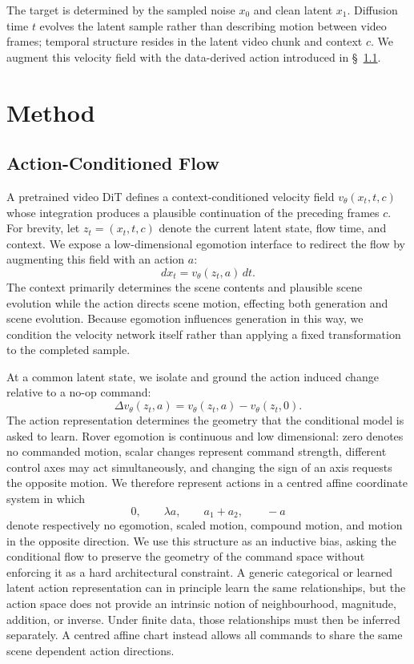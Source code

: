 \documentclass[letterpaper]{article} %
\begin{document}
The target is determined by the sampled noise $x_0$ and clean latent
$x_1$. Diffusion time $t$ evolves the latent sample rather than
describing motion between video frames; temporal structure resides in
the latent video chunk and context $c$. We augment this velocity field
with the data-derived action introduced in \S~\ref{sec:planar}.
\section{Method}
\subsection{Action-Conditioned Flow}
\label{sec:planar}

A pretrained video DiT defines a context-conditioned velocity field
$v_\theta(x_t,t,c)$ whose integration produces a plausible continuation of
the preceding frames $c$. For brevity, let $z_t=(x_t,t,c)$ denote the current
latent state, flow time, and context. We expose a low-dimensional egomotion
interface to redirect the flow by augmenting this field with an action $a$:
\begin{equation}
    d x_t = v_\theta(z_t,a)\,dt.
    \label{eq:action_conditioned_ode}
\end{equation}
The context primarily determines the scene contents and plausible scene evolution while the action directs scene motion, effecting both generation and scene evolution. Because egomotion influences generation in this way, we condition the velocity network itself rather than applying a
fixed transformation to the completed sample.

At a common latent state, we isolate and ground the action induced change relative to a no-op command:
\begin{equation}
    \Delta v_\theta(z_t,a)
    =
    v_\theta(z_t,a)
    -
    v_\theta(z_t,0).
    \label{eq:action_flow_difference}
\end{equation}
The action representation determines the geometry that the conditional model
is asked to learn. Rover egomotion is continuous and low dimensional: zero
denotes no commanded motion, scalar changes represent command strength,
different control axes may act simultaneously, and changing the sign of an
axis requests the opposite motion. We therefore represent actions in a
centred affine coordinate system in which
\begin{equation}
    0,\qquad
    \lambda a,\qquad
    a_1+a_2,\qquad
    -a
\end{equation}
denote respectively no egomotion, scaled motion, compound motion, and motion
in the opposite direction. We use this structure as an inductive bias, asking the conditional flow to preserve the geometry of the command space without enforcing it as a hard architectural constraint. A generic
categorical or learned latent action representation can in principle learn
the same relationships, but the action space does not provide an intrinsic notion of neighbourhood, magnitude, addition, or inverse. Under finite data, those relationships must then be inferred separately. A centred affine chart
instead allows all commands to share the same scene dependent action
directions.
\end{document}
